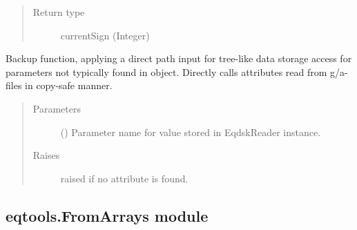 \documentclass[letterpaper,10pt,english]{sphinxmanual}
\begin{document}
\begin{fulllineitems}
\begin{fulllineitems}
\begin{quote}
\begin{description}
\item[{Return type}] \leavevmode
currentSign (Integer)

\end{description}\end{quote}

\end{fulllineitems}


\begin{fulllineitems}
\label{\detokenize{eqtools:eqtools.EFIT.EFITTree.getParam}}
Backup function, applying a direct path input for tree-like data
storage access for parameters not typically found in
 object.
Directly calls attributes read from g/a-files in copy-safe manner.
\begin{quote}\begin{description}
\item[{Parameters}] \leavevmode
{} () \textendash{} Parameter name for value stored in EqdskReader
instance.

\item[{Raises}] \leavevmode
{} \textendash{} raised if no attribute is found.

\end{description}\end{quote}

\end{fulllineitems}


\end{fulllineitems}



\subsection{eqtools.FromArrays module}
\label{\detokenize{eqtools:module-eqtools.FromArrays}}\label{\detokenize{eqtools:eqtools-fromarrays-module}}
\end{document}
